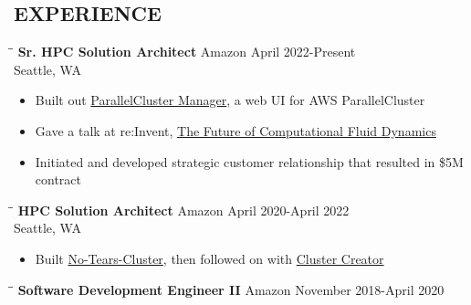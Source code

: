 \documentclass{res}
\begin{document}
\begin{resume}
\section{EXPERIENCE}
\vspace{-0.10in}
 \begin{tabbing}
   \hspace{2.5in}\= \hspace{2.6in}\= \kill %
    {\bf Sr. HPC Solution Architect} \>Amazon     \>April 2022-Present\\
                             \>Seattle, WA
   \end{tabbing}\vspace{-10pt}      %
   \begin{itemize}
   \setlength\itemsep{0em}
\item Built out \href{https://pcluster.cloud/}{ParallelCluster Manager}, a web UI for AWS ParallelCluster
\item Gave a talk at re:Invent, \href{https://swsmith.cc/slides/CMP208-CFD-in-Cloud.pdf}{The Future of Computational Fluid Dynamics}
\item Initiated and developed strategic customer relationship that resulted in \$5M contract
    \end{itemize}
\vspace{-0.10in}
 \begin{tabbing}
   \hspace{2.5in}\= \hspace{2.6in}\= \kill %
    {\bf HPC Solution Architect} \>Amazon     \>April 2020-April 2022\\
                             \>Seattle, WA
   \end{tabbing}\vspace{-10pt}      %
   \begin{itemize}
   \setlength\itemsep{0em}
\item Built \href{https://github.com/aws-samples/no-tears-cluster}{No-Tears-Cluster}, then followed on with \href{https://cluster-creator.swsmith.cc/}{Cluster Creator}
    \end{itemize}
\vspace{-0.10in}
 \begin{tabbing}
   \hspace{2.5in}\= \hspace{2.6in}\= \kill %
    {\bf Software Development Engineer II} \>Amazon     \>November 2018-April 2020\\

\end{tabbing}
\end{resume}
\end{document}
